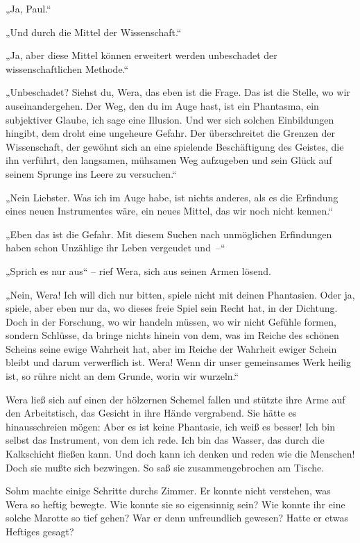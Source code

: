 „Ja, Paul.“

„Und durch die Mittel der Wissenschaft.“

„Ja, aber diese Mittel können erweitert werden unbeschadet der
wissenschaftlichen Methode.“

„Unbeschadet? Siehst du, Wera, das eben ist die Frage. Das ist die
Stelle, wo wir auseinandergehen. Der Weg, den du im Auge hast, ist
ein Phantasma, ein subjektiver Glaube, ich sage eine Illusion. Und
wer sich solchen Einbildungen hingibt, dem droht eine ungeheure
Gefahr. Der überschreitet die Grenzen der Wissenschaft, der gewöhnt
sich an eine spielende Beschäftigung des Geistes, die ihn verführt,
den langsamen, mühsamen Weg aufzugeben und sein Glück auf seinem
Sprunge ins Leere zu versuchen.“

„Nein Liebster. Was ich im Auge habe, ist nichts anderes, als es
die Erfindung eines neuen Instrumentes wäre, ein neues Mittel, das
wir noch nicht kennen.“

„Eben das ist die Gefahr. Mit diesem Suchen nach unmöglichen
Erfindungen haben schon Unzählige ihr Leben vergeudet und~–“

„Sprich es nur aus“ – rief Wera, sich aus seinen Armen lösend.

„Nein, Wera! Ich will dich nur bitten, spiele nicht mit deinen
Phantasien. Oder ja, spiele, aber eben nur da, wo dieses freie
Spiel sein Recht hat, in der Dichtung. Doch in der Forschung, wo
wir handeln müssen, wo wir nicht Gefühle formen, sondern Schlüsse,
da bringe nichts hinein von dem, was im Reiche des schönen Scheins
seine ewige Wahrheit hat, aber im Reiche der Wahrheit ewiger Schein
bleibt und darum verwerflich ist. Wera! Wenn dir unser gemeinsames
Werk heilig ist, so rühre nicht an dem Grunde, worin wir wurzeln.“

Wera ließ sich auf einen der hölzernen Schemel fallen und stützte
ihre Arme auf den Arbeitstisch, das Gesicht in ihre Hände
vergrabend. Sie hätte es hinausschreien mögen: Aber es ist keine
Phantasie, ich weiß es besser! Ich bin selbst das Instrument, von
dem ich rede. Ich bin das Wasser, das durch die Kalkschicht fließen
kann. Und doch kann ich denken und reden wie die Menschen! Doch sie
mußte sich bezwingen. So saß sie zusammengebrochen am Tische.

Sohm machte einige Schritte durchs Zimmer. Er konnte nicht
verstehen, was Wera so heftig bewegte. Wie konnte sie so
eigensinnig sein? Wie konnte ihr eine solche Marotte so tief gehen?
War er denn unfreundlich gewesen? Hatte er etwas Heftiges gesagt?

